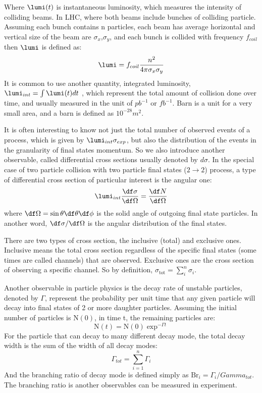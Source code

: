 Where $\lumi(t)$ is instantaneous luminosity, which measures the intensity of colliding beams. In LHC, where both beams include bunches of colliding particle. Assuming each bunch contains n particles, each beam has average horizontal and vertical size of the beam are $\sigma_x$,$\sigma_y$, and each bunch is collided with frequency $f_{coil}$ then $\lumi$ is defined as:
\begin{equation}
\lumi = f_{coil}\frac{n^2}{4\pi \sigma_x \sigma_y}
\end{equation}
 It is common to use another quantity, integrated luminosity, $\lumi_{int} = \int \lumi(t)dt$ , which represent the total amount of collision done over time, and usually measured in the unit of $pb^{-1}$ or $fb^{-1}$. Barn is a unit for a very small area, and a barn is defined as $10^{-28}m^2$.
 
 It is often interesting to know not just the total number of observed events of a process, which is given by $\lumi_{int}\sigma_{exp}$, but also the distribution of the events in the granularity of final states momentum. So we also introduce another observable, called differential cross sections usually denoted by $d\sigma$. In the special case of two particle collision with two particle final states ($2\rightarrow2$) process, a type of differential cross section of particular interest is the angular one:
 \begin{equation}
 \lumi_{int}\frac{\df\sigma}{\df\Omega}=\frac{\df N}{\df \Omega}
 \end{equation} 
 where $\df \Omega=\sin\theta\df\theta\df \phi$ is the solid angle of outgoing final state particles. In another word, $\df \sigma/\df \Omega$ is the angular distribution of the final states.
 
 There are two types of cross section, the inclusive (total) and exclusive ones. Inclusive means the total cross section regardless of the specific final states (some times are called channels) that are observed. Exclusive ones are the cross section of observing a specific channel. So by definition, $\sigma_{\mathrm{tot}}=\sum_{i}^{n}\sigma_i$.
 
 Another observable in particle physics is the decay rate of unstable particles, denoted by $\Gamma$, represent the probability per unit time that any given particle will decay into final states of 2 or more daughter particles. Assuming the initial number of particles is $\mathrm{N}(0)$, in time t, the remaining particles are:
 \begin{equation}
 \mathrm{N}(t) = \mathrm{N}(0)\exp^{-\Gamma t}
 \end{equation}
 For the particle that can decay to many different decay mode, the total decay width is the sum of the width of all decay modes:
 \begin{equation}
 \Gamma_{tot} = \sum_{i=1}^{n}\Gamma_i
 \end{equation}
 And the branching ratio of decay mode is defined simply as $\mathrm{Br}_i = \Gamma_i/Gamma_{tot} $. The branching ratio is another observables can be measured in experiment.

